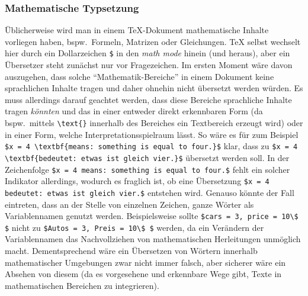 \subsubsection{Mathematische Typsetzung}
Üblicherweise wird man in einem \TeX{}-Dokument mathematische Inhalte vorliegen haben, bspw.\ Formeln, Matrizen oder Gleichungen. \TeX{} selbst wechselt hier durch ein Dollarzeichen \verb|$| in den \textit{math mode} hinein (und heraus), aber ein Übersetzer steht zunächst nur vor Fragezeichen. Im ersten Moment wäre davon auszugehen, dass solche \enquote{Mathematik-Bereiche} in einem Dokument keine sprachlichen Inhalte tragen und daher ohnehin nicht übersetzt werden würden. Es muss allerdings darauf geachtet werden, dass diese Bereiche sprachliche Inhalte tragen \textit{könnten} und das in einer entweder direkt erkennbaren Form (da bspw.\ mittels \verb|\text{}| innerhalb des Bereiches ein Textbereich erzeugt wird) oder in einer Form, welche Interpretationsspielraum lässt. 
So wäre es für zum Beispiel \verb|$x = 4 \textbf{means: something is equal to four.}$| klar, dass zu \verb|$x = 4 \textbf{bedeutet: etwas ist gleich vier.}$| übersetzt werden soll. 
In der Zeichenfolge \verb|$x = 4 means: something is equal to four.$| fehlt ein solcher Indikator allerdings, wodurch es fraglich ist, ob eine Übersetzung \verb|$x = 4 bedeutet: etwas ist gleich vier.$| entstehen wird. Genauso könnte der Fall eintreten, dass an der Stelle von einzelnen Zeichen, ganze Wörter als Variablennamen genutzt werden. Beispielsweise sollte \verb|$cars = 3, price = 10\$ $| nicht zu \verb|$Autos = 3, Preis = 10\$ $| werden, da ein Verändern der Variablennamen das Nachvollziehen von mathematischen Herleitungen unmöglich macht. Dementsprechend wäre ein Übersetzen von Wörtern innerhalb mathematischer Umgebungen zwar nicht immer falsch, aber sicherer wäre ein Absehen von diesem (da es vorgesehene und erkennbare Wege gibt, Texte in mathematischen Bereichen zu integrieren).

